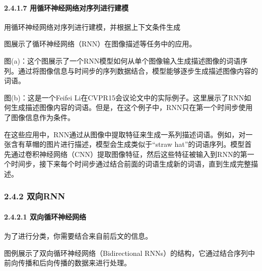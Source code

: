 \paragraph{\texorpdfstring{\textbf{2.4.1.7}
\textbf{用循环神经网络对序列进行建模}}{2.4.1.7 用循环神经网络对序列进行建模}}\label{2417-ux7528ux5faaux73afux795eux7ecfux7f51ux7edcux5bf9ux5e8fux5217ux8fdbux884cux5efaux6a21}

用循环神经网络对序列进行建模，并根据上下文条件生成


图展示了循环神经网络（RNN）在图像描述等任务中的应用。

图(a)：这个图展示了一个RNN模型如何从单个图像输入生成描述图像的词语序列。通过将图像信息与时间步的序列数据结合，模型能够逐步生成描述图像内容的词语。

图(b)：这是一个Feifei
Li在CVPR\textquotesingle15会议论文中的实际例子。这里展示了RNN如何生成描述图像内容的词语。但是，在这个例子中，RNN只在第一个时间步使用了图像信息作为条件。

在这些应用中，RNN通过从图像中提取特征来生成一系列描述词语。例如，对一张含有草帽的图片进行描述，模型会生成类似于``straw
hat''的词语序列。模型首先通过卷积神经网络（CNN）提取图像特征，然后这些特征被输入到RNN的第一个时间步，接下来每个时间步通过结合前面的词语生成新的词语，直到生成完整描述。

\subsubsection{\texorpdfstring{\textbf{2.4.2
双向RNN}}{2.4.2 双向RNN}}\label{242-ux53ccux5411rnn}

\paragraph{\texorpdfstring{\textbf{2.4.2.1
双向循环神经网络}}{2.4.2.1 双向循环神经网络}}\label{2421-ux53ccux5411ux5faaux73afux795eux7ecfux7f51ux7edc}

为了进行分类，你需要结合来自前后文的信息。


图例展示了双向循环神经网络（Bidirectional
RNNs）的结构，它通过结合序列中前向传播和后向传播的数据来进行处理。

